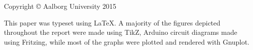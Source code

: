 \thispagestyle{empty}
{\small
\strut\vfill
\noindent Copyright \copyright{} Aalborg University 2015\par
\vspace{0.2cm}
\noindent This paper was typeset using \LaTeX. A majority of the figures depicted throughout the report were made using TikZ, Arduino circuit diagrams made using Fritzing, while most of the graphs were plotted and rendered with Gnuplot. }
\clearpage
